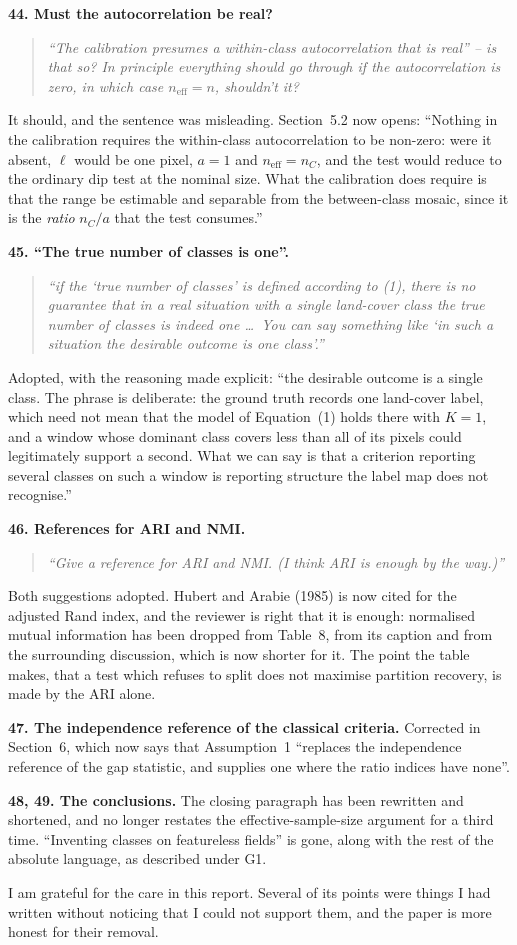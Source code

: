 \documentclass[11pt]{article}
\newcommand{\neff}{n_{\mathrm{eff}}}
\newcommand{\R}[1]{\medskip\noindent\textbf{#1}\quad}
\newenvironment{rquote}{\begin{quote}\itshape}{\end{quote}}
\begin{document}
\R{44. Must the autocorrelation be real?}
\begin{rquote}
``The calibration presumes a within-class autocorrelation that is real'' -- is
that so? In principle everything should go through if the autocorrelation is
zero, in which case $\neff=n$, shouldn't it?
\end{rquote}
It should, and the sentence was misleading. Section~5.2 now opens: ``Nothing in
the calibration requires the within-class autocorrelation to be non-zero: were
it absent, $\ell$ would be one pixel, $a=1$ and $\neff=n_C$, and the test would
reduce to the ordinary dip test at the nominal size. What the calibration does
require is that the range be estimable and separable from the between-class
mosaic, since it is the \emph{ratio} $n_C/a$ that the test consumes.''

\R{45. ``The true number of classes is one''.}
\begin{rquote}
``if the `true number of classes' is defined according to (1), there is no
guarantee that in a real situation with a single land-cover class the true
number of classes is indeed one \dots\ You can say something like `in such a
situation the desirable outcome is one class'.''
\end{rquote}
Adopted, with the reasoning made explicit: ``the desirable outcome is a single
class. The phrase is deliberate: the ground truth records one land-cover label,
which need not mean that the model of Equation~(1) holds there with $K=1$, and
a window whose dominant class covers less than all of its pixels could
legitimately support a second. What we can say is that a criterion reporting
several classes on such a window is reporting structure the label map does not
recognise.''

\R{46. References for ARI and NMI.}
\begin{rquote}
``Give a reference for ARI and NMI. (I think ARI is enough by the way.)''
\end{rquote}
Both suggestions adopted. Hubert and Arabie (1985) is now cited for the
adjusted Rand index, and the reviewer is right that it is enough: normalised
mutual information has been dropped from Table~8, from its caption and from the
surrounding discussion, which is now shorter for it. The point the table makes,
that a test which refuses to split does not maximise partition recovery, is
made by the ARI alone.

\R{47. The independence reference of the classical criteria.}
Corrected in Section~6, which now says that Assumption~1 ``replaces the
independence reference of the gap statistic, and supplies one where the ratio
indices have none''.

\R{48, 49. The conclusions.}
The closing paragraph has been rewritten and shortened, and no longer restates
the effective-sample-size argument for a third time. ``Inventing classes on
featureless fields'' is gone, along with the rest of the absolute language, as
described under G1.

\bigskip
\noindent
I am grateful for the care in this report. Several of its points were things I
had written without noticing that I could not support them, and the paper is
more honest for their removal.
\end{document}
